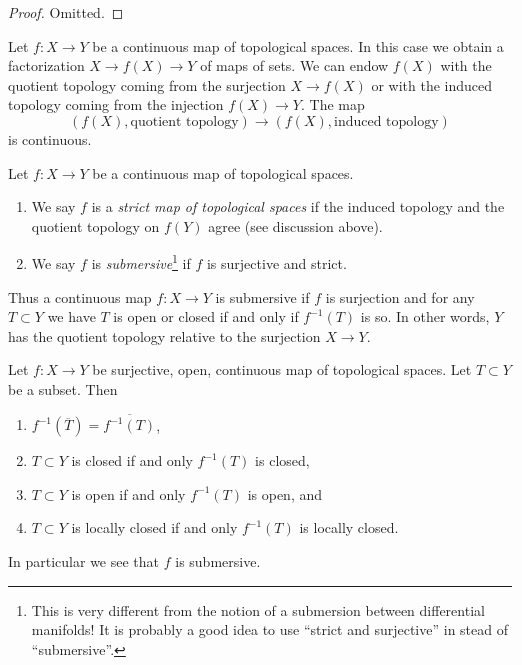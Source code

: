 \begin{proof}
Omitted.
\end{proof}

\noindent
Let $f : X \to Y$ be a continuous map of topological spaces.
In this case we obtain a factorization $X \to f(X) \to Y$
of maps of sets. We can endow $f(X)$ with the
quotient topology coming from the surjection $X \to f(X)$
or with the induced topology coming from the injection $f(X) \to Y$.
The map
$$
(f(X), \text{quotient topology})
\longrightarrow
(f(X), \text{induced topology})
$$
is continuous.

\begin{definition}
\label{definition-submersive}
Let $f : X \to Y$ be a continuous map of topological spaces.
\begin{enumerate}
\item We say $f$ is a {\it strict map of topological spaces}
if the induced topology and the quotient topology on $f(Y)$ agree
(see discussion above).
\item We say $f$ is {\it submersive}\footnote{This is very different from
the notion of a submersion between differential manifolds! It is probably
a good idea to use ``strict and surjective'' in stead of ``submersive''.}
if $f$ is surjective and strict.
\end{enumerate}
\end{definition}

\noindent
Thus a continuous map $f : X \to Y$ is submersive if $f$
is surjection and for any $T \subset Y$ we have
$T$ is open or closed if and only if $f^{-1}(T)$ is so.
In other words, $Y$ has the
quotient topology relative to the surjection $X \to Y$.

\begin{lemma}
\label{lemma-open-morphism-quotient-topology}
Let $f : X \to Y$ be surjective, open, continuous map of topological spaces.
Let $T \subset Y$ be a subset. Then
\begin{enumerate}
\item $f^{-1}(\overline{T}) = \overline{f^{-1}(T)}$,
\item $T \subset Y$ is closed if and only $f^{-1}(T)$ is closed,
\item $T \subset Y$ is open if and only $f^{-1}(T)$ is open, and
\item $T \subset Y$ is locally closed if and only $f^{-1}(T)$ is locally closed.
\end{enumerate}
In particular we see that $f$ is submersive.
\end{lemma}

